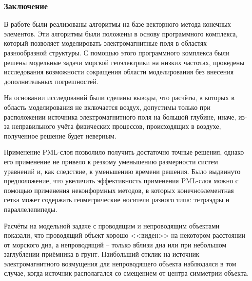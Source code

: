 \documentclass[aspectratio=43]{beamer}
\newcommand{\MakeTitle}[1]{\frametitle{\hspace{1.5em}\textbf{#1} \hfill \insertframenumber{} }}
\begin{document}

\begin{frame}
	\MakeTitle{Заключение}
	В работе были реализованы алгоритмы на базе векторного метода конечных элементов. Эти алгоритмы были положены в основу программного комплекса, который позволяет моделировать электромагнитные поля в областях разнообразной структуры. С помощью этого программного комплекса были решены модельные задачи морской геоэлектрики на низких частотах, проведены исследования возможности сокращения области моделирования без внесения дополнительных погрешностей.

	На основании исследований были сделаны выводы, что расчёты, в которых в область моделирования не включается воздух, допустимы только при расположении источника электромагнитного поля на большой глубине, иначе, из-за неправильного учёта физических процессов, происходящих в воздухе, полученное решение будет неверным.

	Применение PML-слоя позволило получить достаточно точные решения, однако его применение не привело к резкому уменьшению размерности систем уравнений и, как следствие, к уменьшению времени решения. Было выдвинуто предположение, что увеличить эффективность применения PML-слоя можно с помощью применения неконформных методов, в которых конечноэлементная сетка может содержать геометрические носители разного типа: тетраэдры и параллелепипеды.

	Расчёты на модельной задаче с проводящим и непроводящим объектами показали, что проводящий объект хорошо <<виден>> на некотором расстоянии от морского дна, а непроводящий -- только вблизи дна или при небольшом заглублении приёмника в грунт. Наибольший отклик на источник электромагнитного возмущения для непроводящего объекта наблюдался в том случае, когда источник располагался со смещением от центра симметрии объекта.
\end{frame}


\end{document}
